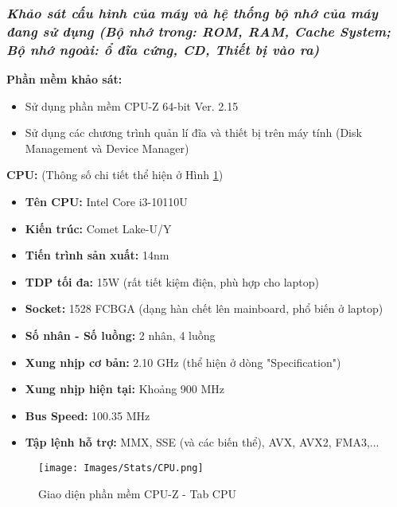 \subsubsection{\textit{Khảo sát cấu hình của máy và hệ thống bộ nhớ của máy đang sử dụng (Bộ nhớ trong: ROM, RAM, Cache System; Bộ nhớ ngoài: ổ đĩa cứng, CD, Thiết bị vào ra)}}

\noindent\textbf{\large Phần mềm khảo sát:} 
\begin{itemize}
    \item Sử dụng phần mềm CPU-Z 64-bit Ver. 2.15
    \item Sử dụng các chương trình quản lí đĩa và thiết bị trên máy tính (Disk Management và Device Manager)
\end{itemize}

\vspace{0.5cm}

\noindent\textbf{\large CPU:} (Thông số chi tiết thể hiện ở Hình \ref{fig:cpu-z-cpu})

\begin{itemize}
    \item \textbf{Tên CPU:} Intel Core i3-10110U
    \item \textbf{Kiến trúc:} Comet Lake-U/Y
    \item \textbf{Tiến trình sản xuất:} 14nm
    \item \textbf{TDP tối đa:} 15W (rất tiết kiệm điện, phù hợp cho laptop)
    \item \textbf{Socket:} 1528 FCBGA (dạng hàn chết lên mainboard, phổ biến ở laptop)
    \item \textbf{Số nhân - Số luồng:} 2 nhân, 4 luồng
    \item \textbf{Xung nhịp cơ bản:} 2.10 GHz (thể hiện ở dòng "Specification")
    \item \textbf{Xung nhịp hiện tại:} Khoảng 900 MHz
    \item \textbf{Bus Speed:} 100.35 MHz
    \item \textbf{Tập lệnh hỗ trợ:} MMX, SSE (và các biến thể), AVX, AVX2, FMA3,...
\end{itemize}

\begin{center}
\end{center}

\begin{figure}[H]
    \centering
    \texttt{[image: Images/Stats/CPU.png]}
    \caption{Giao diện phần mềm CPU-Z - Tab CPU}
    \label{fig:cpu-z-cpu}
\end{figure}


